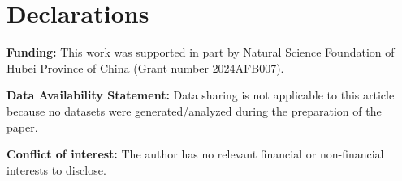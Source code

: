 \documentclass[reqno,12pt]{amsart}
\numberwithin{equation}{section}
\begin{document}
\section*{Declarations} 

\textbf{Funding:} This work was supported in part by Natural Science Foundation of Hubei Province of China (Grant number 2024AFB007).

\vspace{2mm}

\textbf{Data Availability Statement:} Data sharing is not applicable to this article because no datasets were generated/analyzed during the preparation of the paper.

\vspace{2mm}

\textbf{Conflict of interest:} The author has no relevant financial or non-financial interests to disclose.
\end{document}
